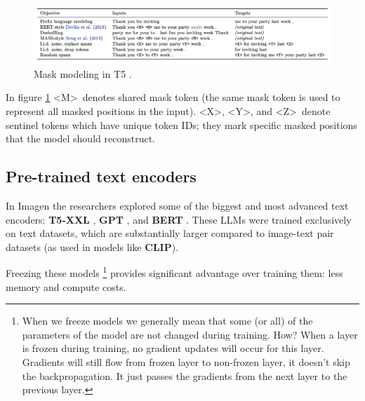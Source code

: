 \begin{figure}[h]
    \centering
    \includegraphics[width=1\textwidth]{images/imagen/t5_objectives.png}
    \caption{Mask modeling in T5 \cite{t5_model}.}
    \label{fig:t5_objectives}
\end{figure}

In figure \ref{fig:t5_objectives} \textless M\textgreater\ denotes shared mask token (the same mask token is used to represent all masked positions in the input). \textless X\textgreater, \textless Y\textgreater, and \textless Z\textgreater\ denote sentinel tokens which have unique token IDs; they mark specific masked positions that the model should reconstruct.















\subsection{Pre-trained text encoders}

In Imagen \cite{imagen} the researchers explored some of the biggest and most advanced text encoders: \textbf{T5-XXL} \cite{t5_model}, \textbf{GPT} \cite{gpt} \cite{mingpt} \cite{gpt_another}, and \textbf{BERT} \cite{bert}. These LLMs were trained exclusively on text datasets, which are substantially larger compared to image-text pair datasets (as used in models like \textbf{CLIP}).

Freezing these models \footnote{When we freeze models we generally mean that some (or all) of the parameters of the model are not changed during training. How? When a layer is frozen during training, no gradient updates will occur for this layer. Gradients will still flow from frozen layer to non-frozen layer, it doesn't skip the backpropagation. It just passes the gradients from the next layer to the previous layer.} provides significant advantage over training them: less memory and compute costs.














